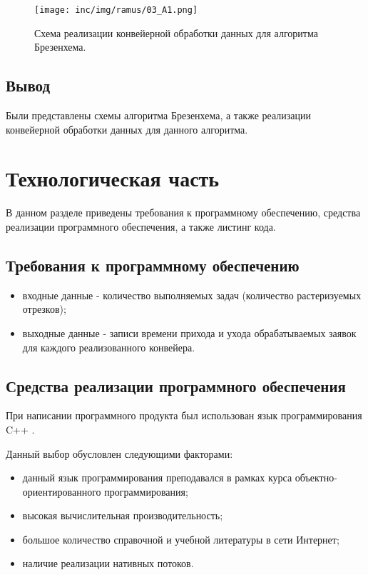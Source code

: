 \documentclass[12pt]{report}
\begin{document}
\newpage

\begin{figure}[ht]
\begin{center}
\texttt{[image: inc/img/ramus/03\_A1.png]}
\captionsetup{justification=centering}
	\caption{Схема реализации конвейерной обработки данных для алгоритма Брезенхема.}
	\label{img:conveyor:2}	
\end{center}
\end{figure}

\newpage

\section*{Вывод}
Были представлены схемы алгоритма Брезенхема, а также реализации конвейерной обработки данных для данного алгоритма.

\chapter{Технологическая часть}
В данном разделе приведены требования к программному обеспечению, средства реализации программного обеспечения, а также листинг кода.

\section{Требования к программному обеспечению}
\begin{itemize}
\item входные данные - количество выполняемых задач (количество растеризуемых отрезков);
\item выходные данные - записи времени прихода и ухода обрабатываемых заявок для каждого реализованного конвейера.
\end{itemize}

\section{Средства реализации программного обеспечения}
При написании программного продукта был использован язык программирования C++ \cite{Cpp}.

Данный выбор обусловлен следующими факторами:
\begin{itemize}
\item данный язык программирования преподавался в рамках курса объектно-ориентированного программирования;
\item высокая вычислительная производительность;
\item большое количество справочной и учебной литературы в сети Интернет;
\item наличие реализации нативных потоков.
\end{itemize}
\end{document}
